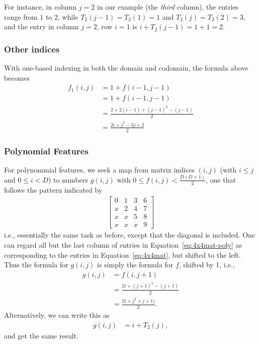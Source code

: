 \documentclass{article} %
\begin{document}
For instance, in column $j = 2$ in our example (the \emph{third} column), the entries range from $1$ to $2$, while $T_2(j-1) = T_2(1) = 1$ and $T_2(j) = T_2(2) = 3$, and the entry in column $j = 2$, row $i = 1$ is 
$i + T_2(j-1) = 1 + 1 = 2$. 

\subsubsection{Other indices}
With one-based indexing in both the domain and codomain, the formula above becomes
\begin{align}
f_1(i, j) &= 1+ f(i-1, j-1) \\
&= 1+ f(i-1, j-1) \\
& = \frac{2 + 2(i-1) + (j-1)^2-(j-1)}{2}\\
& = \frac{2i + j^2 - 3j + 2}{2}
\end{align}

\subsubsection{Polynomial Features}
For polynommial features, we seek a map from matrix indices $(i, j)$ (with $i \le j$ and $0 \le i < D$) to numbers $g(i, j)$ with $0 \le f(i, j) < \frac{D(D+1)}{2}$, one that follows the pattern indicated by 
\begin{align}
\begin{bmatrix}
 0 & 1 & 3 & 6 \\
 x & 2 & 4 & 7\\
 x & x & 5 & 8 \\
 x & x & x & 9
\end{bmatrix}
\label{eq:4x4mat-poly}
\end{align}
i.e., essentially the same task as before, except that the diagonal is included. One can regard all but the last column of entries in Equation~\ref{eq:4x4mat-poly} as corresponding to the entries in Equation~\ref{eq:4x4mat}, but shifted to the left. Thus the formula for $g(i, j)$ is simply the formula for $f$, shifted by 1, i.e., 
\begin{align}
g(i, j) &= f(i, j+1)  \\
&=  \frac{2i + (j+1)^2-(j+1)}{2}\\
&=  \frac{2i + j^2 + j + 1)}{2}.
\end{align}
Alternatively, we can write this as
\begin{align}
g(i, j) &= i + T_2(j),
\end{align}
\noindent
and get the same result. 
\end{document}
